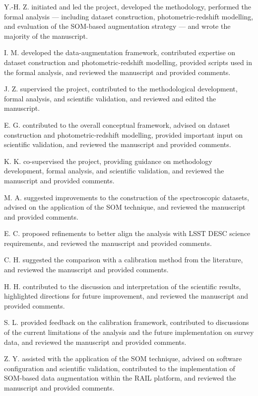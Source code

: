 \documentclass[fleqn, usenatbib]{mnras}
\begin{document}
Y.-H. Z. initiated and led the project, developed the methodology, performed the formal analysis --- including dataset construction, photometric-redshift modelling, and evaluation of the SOM-based augmentation strategy --- and wrote the majority of the manuscript.

I. M. developed the data-augmentation framework, contributed expertise on dataset construction and photometric-redshift modelling, provided scripts used in the formal analysis, and reviewed the manuscript and provided comments.

J. Z. supervised the project, contributed to the methodological development, formal analysis, and scientific validation, and reviewed and edited the manuscript.

E. G. contributed to the overall conceptual framework, advised on dataset construction and photometric-redshift modelling, provided important input on scientific validation, and reviewed the manuscript and provided comments.

K. K. co-supervised the project, providing guidance on methodology development, formal analysis, and scientific validation, and reviewed the manuscript and provided comments.

M. A. suggested improvements to the construction of the spectroscopic datasets, advised on the application of the SOM technique, and reviewed the manuscript and provided comments.

E. C. proposed refinements to better align the analysis with LSST DESC science requirements, and reviewed the manuscript and provided comments.

C. H. suggested the comparison with a calibration method from the literature, and reviewed the manuscript and provided comments.

H. H. contributed to the discussion and interpretation of the scientific results, highlighted directions for future improvement, and reviewed the manuscript and provided comments.

S. L. provided feedback on the calibration framework, contributed to discussions of the current limitations of the analysis and the future implementation on survey data, and reviewed the manuscript and provided comments.

Z. Y. assisted with the application of the SOM technique, advised on software configuration and scientific validation, contributed to the implementation of SOM-based data augmentation within the RAIL platform, and reviewed the manuscript and provided comments.
\end{document}
